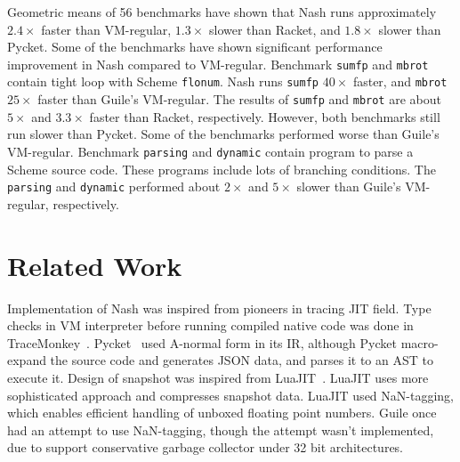 \documentclass[preprint]{sigplanconf}
\begin{document}
Geometric means of 56 benchmarks have shown that Nash runs approximately
$2.4\times$ faster than VM-regular, $1.3\times$ slower than Racket, and
$1.8\times$ slower than Pycket.  Some of the benchmarks have shown significant
performance improvement in Nash compared to VM-regular. Benchmark
\texttt{sumfp} and \texttt{mbrot} contain tight loop with Scheme
\texttt{flonum}. Nash runs \texttt{sumfp} $40\times$ faster, and
\texttt{mbrot} $25\times$ faster than Guile's VM-regular. The results of
\texttt{sumfp} and \texttt{mbrot} are about $5\times$ and $3.3\times$ faster
than Racket, respectively. However, both benchmarks still run slower than
Pycket.  Some of the benchmarks performed worse than Guile's
VM-regular. Benchmark \texttt{parsing} and \texttt{dynamic} contain program to
parse a Scheme source code. These programs include lots of branching
conditions. The \texttt{parsing} and \texttt{dynamic} performed about
$2\times$ and $5\times$ slower than Guile's VM-regular, respectively.


\section{Related Work}
\label{sec:related}
Implementation of Nash was inspired from pioneers in tracing JIT field. Type
checks in VM interpreter before running compiled native code was done in
TraceMonkey~\cite{gal2009trace}. Pycket~\cite{bauman2015pycket} used A-normal
form in its IR, although Pycket macro-expand the source code and generates
JSON data, and parses it to an AST to execute it. Design of snapshot was
inspired from LuaJIT~\cite{pall2016luajit}. LuaJIT uses more sophisticated
approach and compresses snapshot data. LuaJIT used NaN-tagging, which enables
efficient handling of unboxed floating point numbers. Guile once had an
attempt to use NaN-tagging, though the attempt wasn't implemented, due to
support conservative garbage collector under 32 bit architectures.
\end{document}
